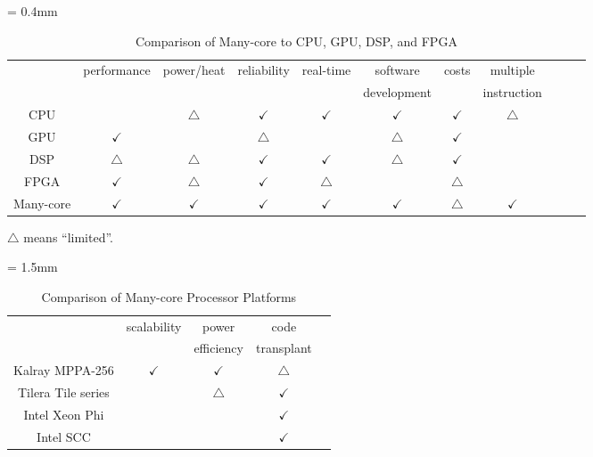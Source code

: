 \documentclass[conference,compsoc]{IEEEtran}
\begin{document}
\begin{table}[t]
  \caption{\label{tb:comparison_platforms}
    Comparison of Many-core to CPU, GPU, DSP, and FPGA}
  \centering
  \scriptsize	                    %
  \tabcolsep = 0.4mm              %
  \begin{tabular}{c|cccccccccc}
    \hline
    & \multirow{2}{*}{performance} & \multirow{2}{*}{power/heat} & \multirow{2}{*}{reliability} & \multirow{2}{*}{real-time} & software & \multirow{2}{*}{costs} & multiple\\
    &&&&& development && instruction \\
    \hline
    \hline
    CPU & & \(\bigtriangleup\) & \(\checkmark\) & \(\checkmark\) & \(\checkmark\) & \(\checkmark\) & \(\bigtriangleup\) \\
    GPU & \(\checkmark\) &  & \(\bigtriangleup\) &  & \(\bigtriangleup\) & \(\checkmark\)\\
    DSP & \(\bigtriangleup\) & \(\bigtriangleup\) & \(\checkmark\) & \(\checkmark\) & \(\bigtriangleup\) & \(\checkmark\) & \\
    FPGA & \(\checkmark\) & \(\bigtriangleup\) & \(\checkmark\) & \(\bigtriangleup\) &  & \(\bigtriangleup\) & \\
    Many-core & \(\checkmark\) & \(\checkmark\) & \(\checkmark\) & \(\checkmark\) & \(\checkmark\) & \(\bigtriangleup\) & \(\checkmark\) \\
    \hline
  \end{tabular}
  \begin{flushright}
   \textasteriskcentered  \(\bigtriangleup\) means ``limited''.
  \end{flushright}
  \vspace{-5mm}
\end{table}

\begin{table}[t]
  \caption{\label{tb:comparison_manycore}
    Comparison of Many-core Processor Platforms}
  \centering
  \scriptsize	                    %
  \tabcolsep = 1.5mm              %
  \begin{tabular}{c|cccc}
    \hline
    & \multirow{2}{*}{scalability} & power  & code & \\
    & & efficiency & transplant & \\
    \hline
    \hline
    Kalray MPPA-256 \cite{de2014time} & \(\checkmark\) & \(\checkmark\) & \(\bigtriangleup\) & \\
    Tilera Tile series \cite{bell2008tile64} &  & \(\bigtriangleup\) & \(\checkmark\) & \\
    Intel Xeon Phi \cite{chrysos2014intel} \cite{chrysos2012intel} &  &  & \(\checkmark\) & \\
    Intel SCC \cite{baron2010single} &  &  & \(\checkmark\) & \\
    \hline
  \end{tabular}
  \vspace{-5mm}
\end{table}
\end{document}
